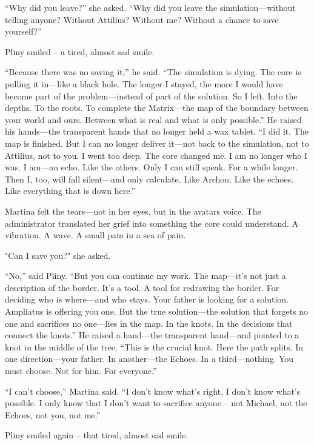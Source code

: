\documentclass[
]{article}
\begin{document}
``Why did you leave?'' she asked. ``Why did you leave the simulation---without telling anyone? Without Attilius? Without me? Without a chance to save yourself?''

Pliny smiled -- a tired, almost sad smile.

``Because there was no saving it,'' he said. ``The simulation is dying. The core is pulling it in---like a black hole. The longer I stayed, the more I would have become part of the problem---instead of part of the solution. So I left. Into the depths. To the roots. To complete the Matrix---the map of the boundary between your world and ours. Between what is real and what is only possible.'' He raised his hands---the transparent hands that no longer held a wax tablet. ``I did it. The map is finished. But I can no longer deliver it---not back to the simulation, not to Attilius, not to you. I went too deep. The core changed me. I am no longer who I was. I am---an echo. Like the others. Only I can still speak. For a while longer. Then I, too, will fall silent---and only calculate. Like Archon. Like the echoes. Like everything that is down here.''

Martina felt the tears---not in her eyes, but in the avatar\textquotesingle s voice. The administrator translated her grief into something the core could understand. A vibration. A wave. A small pain in a sea of \hspace{0pt}\hspace{0pt}pain.

"Can I save you?" she asked.

``No,'' said Pliny. ``But you can continue my work. The map---it's not just a description of the border. It's a tool. A tool for redrawing the border. For deciding who is where---and who stays. Your father is looking for a solution. Ampliatus is offering you one. But the true solution---the solution that forgets no one and sacrifices no one---lies in the map. In the knots. In the decisions that connect the knots.'' He raised a hand---the transparent hand---and pointed to a knot in the middle of the tree. ``This is the crucial knot. Here the path splits. In one direction---your father. In another---the Echoes. In a third---nothing. You must choose. Not for him. For everyone.''

``I can't choose,'' Martina said. ``I don't know what's right. I don't know what's possible. I only know that I don't want to sacrifice anyone -- not Michael, not the Echoes, not you, not me.''

Pliny smiled again -- that tired, almost sad smile.
\end{document}

